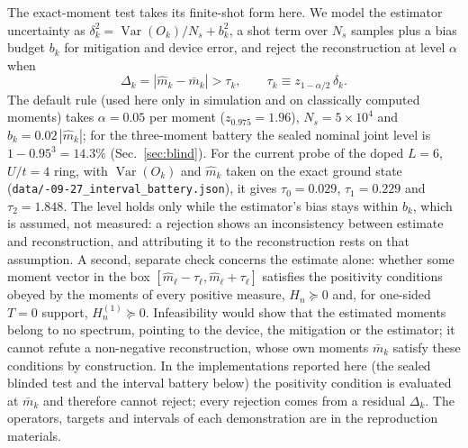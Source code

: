 \documentclass[submission, PhysCore]{SciPost}
\begin{document}
\begin{appendix}
The exact-moment test takes its finite-shot form here. We model the estimator uncertainty as $\delta_k^2=\operatorname{Var}(O_k)/N_s+b_k^2$, a shot term over $N_s$ samples plus a bias budget $b_k$ for mitigation and device error, and reject the reconstruction at level $\alpha$ when
\[
\Delta_k=|\widehat{m}_k-\bar m_k|>\tau_k,\qquad \tau_k\equiv z_{1-\alpha/2}\,\delta_k .
\]
The default rule (used here only in simulation and on classically computed moments) takes $\alpha=0.05$ per moment ($z_{0.975}=1.96$), $N_s=5\times10^4$ and $b_k=0.02\,|\widehat m_k|$; for the three-moment battery the sealed nominal joint level is ${1-0.95^3=14.3\%}$ (Sec.~\ref{sec:blind}). For the current probe of the doped $L=6$, $U/t=4$ ring, with $\operatorname{Var}(O_k)$ and $\widehat m_k$ taken on the exact ground state (\texttt{data/-09-27\_interval\_battery.json}), it gives $\tau_0=0.029$, $\tau_1=0.229$ and $\tau_2=1.848$. The level holds only while the estimator's bias stays within $b_k$, which is assumed, not measured: a rejection shows an inconsistency between estimate and reconstruction, and attributing it to the reconstruction rests on that assumption. A second, separate check concerns the estimate alone: whether some moment vector in the box $[\widehat m_\ell-\tau_\ell,\widehat m_\ell+\tau_\ell]$ satisfies the positivity conditions obeyed by the moments of every positive measure, $H_n\succeq0$ and, for one-sided $T=0$ support, $H_n^{(1)}\succeq0$. Infeasibility would show that the estimated moments belong to no spectrum, pointing to the device, the mitigation or the estimator; it cannot refute a non-negative reconstruction, whose own moments $\bar m_k$ satisfy these conditions by construction. In the implementations reported here (the sealed blinded test and the interval battery below) the positivity condition is evaluated at $\bar m_k$ and therefore cannot reject; every rejection comes from a residual $\Delta_k$. The operators, targets and intervals of each demonstration are in the reproduction materials.


\end{appendix}
\end{document}
